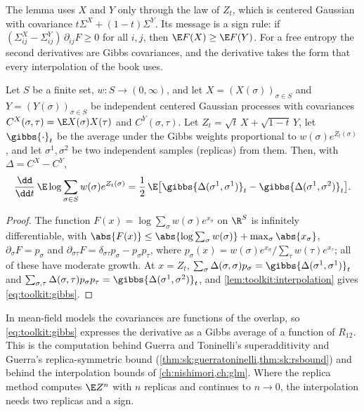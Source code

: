 \begin{refsection}
The lemma uses $X$ and $Y$ only through the law of $Z_t$, which is centered Gaussian with covariance $t\Sigma^X+(1-t)\Sigma^Y$. Its message is a sign rule: if $(\Sigma^X_{ij}-\Sigma^Y_{ij})\,\partial_{ij}F\ge0$ for all $i,j$, then $\E F(X)\ge\E F(Y)$. For a free entropy the second derivatives are Gibbs covariances, and the derivative takes the form that every interpolation of the book uses.

\begin{corollary}\label{cor:toolkit:gibbs}
Let $S$ be a finite set, $w\colon S\to(0,\infty)$, and let $X=(X(\sigma))_{\sigma\in S}$ and $Y=(Y(\sigma))_{\sigma\in S}$ be independent centered Gaussian processes with covariances $C^X(\sigma,\tau)=\E X(\sigma)X(\tau)$ and $C^Y(\sigma,\tau)$. Let $Z_t=\sqrt t\,X+\sqrt{1-t}\,Y$, let $\gibbs{\cdot}_t$ be the average under the Gibbs weights proportional to $w(\sigma)e^{Z_t(\sigma)}$, and let $\sigma^1,\sigma^2$ be two independent samples (replicas) from them. Then, with $\Delta=C^X-C^Y$,
\begin{equation}\label{eq:toolkit:gibbs}
\frac{\dd}{\dd t}\,\E\log\sum_{\sigma\in S}w(\sigma)e^{Z_t(\sigma)}=\frac12\,\E\bigl[\gibbs{\Delta(\sigma^1,\sigma^1)}_t-\gibbs{\Delta(\sigma^1,\sigma^2)}_t\bigr].
\end{equation}
\end{corollary}

\begin{proof}
The function $F(x)=\log\sum_\sigma w(\sigma)e^{x_\sigma}$ on $\R^S$ is infinitely differentiable, with $\abs{F(x)}\le\abs{\log\sum_\sigma w(\sigma)}+\max_\sigma\abs{x_\sigma}$, $\partial_\sigma F=p_\sigma$ and $\partial_{\sigma\tau}F=\delta_{\sigma\tau}p_\sigma-p_\sigma p_\tau$, where $p_\sigma(x)=w(\sigma)e^{x_\sigma}/\sum_\tau w(\tau)e^{x_\tau}$; all of these have moderate growth. At $x=Z_t$, $\sum_\sigma\Delta(\sigma,\sigma)p_\sigma=\gibbs{\Delta(\sigma^1,\sigma^1)}_t$ and $\sum_{\sigma,\tau}\Delta(\sigma,\tau)p_\sigma p_\tau=\gibbs{\Delta(\sigma^1,\sigma^2)}_t$, and \cref{lem:toolkit:interpolation} gives \eqref{eq:toolkit:gibbs}.
\end{proof}

In mean-field models the covariances are functions of the overlap, so \eqref{eq:toolkit:gibbs} expresses the derivative as a Gibbs average of a function of $R_{12}$. This is the computation behind Guerra and Toninelli's superadditivity and Guerra's replica-symmetric bound (\cref{thm:sk:guerratoninelli,thm:sk:rsbound}) and behind the interpolation bounds of \cref{ch:nishimori,ch:glm}. Where the replica method computes $\E Z^n$ with $n$ replicas and continues to $n\to0$, the interpolation needs two replicas and a sign.


\end{refsection}
